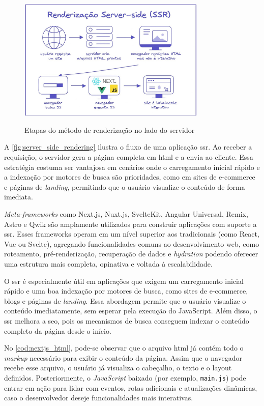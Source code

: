 \begin{figure}[H]
  \centering
  \caption{Etapas do método de renderização no lado do servidor}
  \includegraphics[width=0.8\textwidth]{media/server_side_rendering.jpeg}
  \label{fig:server_side_rendering}
\end{figure}

A \autoref{fig:server_side_rendering} ilustra o fluxo de uma aplicação \acrshort{ssr}. Ao receber a requisição, o servidor gera a página completa em \acrshort{html} e a envia ao cliente. Essa estratégia costuma ser vantajosa em cenários onde o carregamento inicial rápido e a indexação por motores de busca são prioridades, como em sites de e-commerce e páginas de \emph{landing}, permitindo que o usuário visualize o conteúdo de forma imediata. 

\emph{Meta-frameworks} como Next.js, Nuxt.js, SvelteKit, Angular Universal, Remix, Astro e Qwik são amplamente utilizados para construir aplicações com suporte a \acrshort{ssr}. Esses frameworks operam em um nível superior aos tradicionais (como React, Vue ou Svelte), agregando funcionalidades comuns ao desenvolvimento web, como roteamento, pré-renderização, recuperação de dados e \emph{hydration} podendo oferecer uma estrutura mais completa, opinativa e voltada à escalabilidade.

O \acrshort{ssr} é especialmente útil em aplicações que exigem um carregamento inicial rápido e uma boa indexação por motores de busca, como sites de e-commerce, blogs e páginas de \emph{landing}. Essa abordagem permite que o usuário visualize o conteúdo imediatamente, sem esperar pela execução do JavaScript. Além disso, o \acrshort{ssr} melhora a \acrshort{seo}, pois os mecanismos de busca conseguem indexar o conteúdo completo da página desde o início.

No \autoref{cod:nextjs_html}, pode-se observar que o arquivo \acrshort{html} já contém todo o \emph{markup} necessário para exibir o conteúdo da página. Assim que o navegador recebe esse arquivo, o usuário já visualiza o cabeçalho, o texto e o layout definidos. Posteriormente, o \emph{JavaScript} baixado (por exemplo, \texttt{main.js}) pode entrar em ação para lidar com eventos, rotas adicionais e atualizações dinâmicas, caso o desenvolvedor deseje funcionalidades mais interativas.

